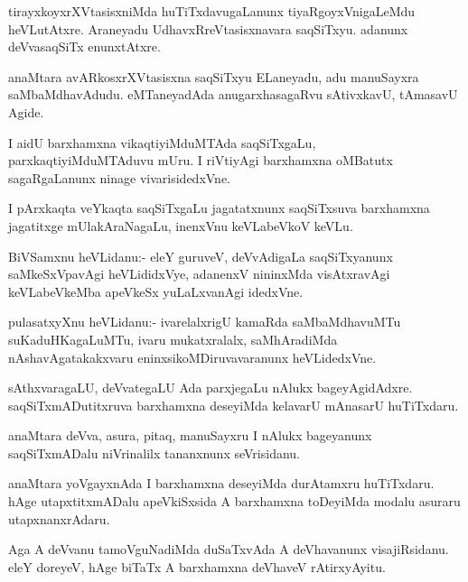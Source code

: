 \documentclass{article}
\begin{document}
\begin{mn}
tirayxkoyxrXVtasisxniMda huTiTxdavugaLanunx tiyaRgoyxVnigaLeMdu
heVLutAtxre. Araneyadu UdhavxRreVtasisxnavara saqSiTxyu. adanunx
deVvasaqSiTx enunxtAtxre.
\end{mn}

\begin{mn}
anaMtara avARkosxrXVtasisxna saqSiTxyu ELaneyadu, adu manuSayxra
saMbaMdhavAdudu. eMTaneyadAda anugarxhasagaRvu sAtivxkavU, tAmasavU Agide.
\end{mn}

\begin{mn}%
I aidU barxhamxna vikaqtiyiMduMTAda saqSiTxgaLu, parxkaqtiyiMduMTAduvu
mUru. I riVtiyAgi barxhamxna oMBatutx sagaRgaLanunx ninage vivarisidedxVne.
\end{mn}

\begin{mn}
I pArxkaqta veYkaqta saqSiTxgaLu jagatatxnunx saqSiTxsuva barxhamxna
jagatitxge mUlakAraNagaLu, inenxVnu keVLabeVkoV keVLu.
\end{mn}

\begin{mn}
BiVSamxnu heVLidanu:- eleY guruveV, deVvAdigaLa saqSiTxyanunx
saMkeSxVpavAgi heVLididxVye, adanenxV nininxMda visAtxravAgi
keVLabeVkeMba apeVkeSx yuLaLxvanAgi idedxVne.
\end{mn}

\begin{mn}
pulasatxyXnu heVLidanu:- ivarelalxrigU kamaRda saMbaMdhavuMTu
suKaduHKagaLuMTu, ivaru mukatxralalx, saMhAradiMda nAshavAgatakakxvaru
eninxsikoMDiruvavaranunx heVLidedxVne.
\end{mn}

\begin{mn}
sAthxvaragaLU, deVvategaLU Ada parxjegaLu nAlukx
bageyAgidAdxre. saqSiTxmADutitxruva barxhamxna deseyiMda kelavarU
mAnasarU huTiTxdaru.
\end{mn}

\begin{mn}%
anaMtara deVva, asura, pitaq, manuSayxru I nAlukx bageyanunx
saqSiTxmADalu niVrinalilx tananxnunx seVrisidanu.
\end{mn}

\begin{mn}
anaMtara yoVgayxnAda I barxhamxna deseyiMda durAtamxru
huTiTxdaru. hAge utapxtitxmADalu apeVkiSxsida A barxhamxna toDeyiMda
modalu asuraru utapxnanxrAdaru.
\end{mn}

\begin{mn}
Aga A deVvanu tamoVguNadiMda duSaTxvAda A deVhavanunx
visajiRsidanu. eleY doreyeV, hAge biTaTx A barxhamxna deVhaveV rAtirxyAyitu.
\end{mn}
\end{document}
